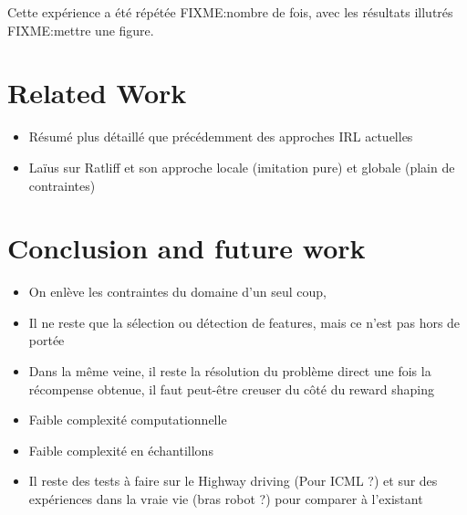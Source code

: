 \documentclass[publibook-draft]{CAp2012}
\begin{document}
Cette expérience a été répétée FIXME:nombre de fois, avec les résultats illutrés FIXME:mettre une figure.
\section{Related Work}
\begin{itemize}
\item Résumé plus détaillé que précédemment des approches IRL actuelles
\item Laïus sur Ratliff et son approche locale (imitation pure) et globale (plain de contraintes)
\end{itemize}
\section{Conclusion and future work}
\begin{itemize}
\item On enlève les contraintes du domaine d'un seul coup,
\item Il ne reste que la sélection ou détection de features, mais ce n'est pas hors de portée
\item Dans la même veine, il reste la résolution du problème direct une fois la récompense obtenue, il faut peut-être creuser du côté du reward shaping
\item Faible complexité computationnelle
\item Faible complexité en échantillons
\item Il reste des tests à faire sur le Highway driving (Pour ICML ?) et sur des expériences dans la vraie vie (bras robot ?) pour comparer à l'existant
\end{itemize}
%
%

\end{document}
